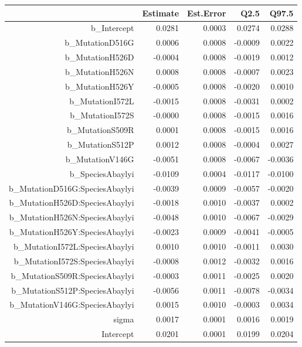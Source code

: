 \begin{table}[ht]
\centering
\begin{tabular}{rrrrr}
  \hline
 & Estimate & Est.Error & Q2.5 & Q97.5 \\ 
  \hline
b\_Intercept & 0.0281 & 0.0003 & 0.0274 & 0.0288 \\ 
  b\_MutationD516G & 0.0006 & 0.0008 & -0.0009 & 0.0022 \\ 
  b\_MutationH526D & -0.0004 & 0.0008 & -0.0019 & 0.0012 \\ 
  b\_MutationH526N & 0.0008 & 0.0008 & -0.0007 & 0.0023 \\ 
  b\_MutationH526Y & -0.0005 & 0.0008 & -0.0020 & 0.0010 \\ 
  b\_MutationI572L & -0.0015 & 0.0008 & -0.0031 & 0.0002 \\ 
  b\_MutationI572S & -0.0000 & 0.0008 & -0.0015 & 0.0016 \\ 
  b\_MutationS509R & 0.0001 & 0.0008 & -0.0015 & 0.0016 \\ 
  b\_MutationS512P & 0.0012 & 0.0008 & -0.0004 & 0.0027 \\ 
  b\_MutationV146G & -0.0051 & 0.0008 & -0.0067 & -0.0036 \\ 
  b\_SpeciesAbaylyi & -0.0109 & 0.0004 & -0.0117 & -0.0100 \\ 
  b\_MutationD516G:SpeciesAbaylyi & -0.0039 & 0.0009 & -0.0057 & -0.0020 \\ 
  b\_MutationH526D:SpeciesAbaylyi & -0.0018 & 0.0010 & -0.0037 & 0.0002 \\ 
  b\_MutationH526N:SpeciesAbaylyi & -0.0048 & 0.0010 & -0.0067 & -0.0029 \\ 
  b\_MutationH526Y:SpeciesAbaylyi & -0.0023 & 0.0009 & -0.0041 & -0.0005 \\ 
  b\_MutationI572L:SpeciesAbaylyi & 0.0010 & 0.0010 & -0.0011 & 0.0030 \\ 
  b\_MutationI572S:SpeciesAbaylyi & -0.0008 & 0.0012 & -0.0032 & 0.0016 \\ 
  b\_MutationS509R:SpeciesAbaylyi & -0.0003 & 0.0011 & -0.0025 & 0.0020 \\ 
  b\_MutationS512P:SpeciesAbaylyi & -0.0056 & 0.0011 & -0.0078 & -0.0034 \\ 
  b\_MutationV146G:SpeciesAbaylyi & 0.0015 & 0.0010 & -0.0003 & 0.0034 \\ 
  sigma & 0.0017 & 0.0001 & 0.0016 & 0.0019 \\ 
  Intercept & 0.0201 & 0.0001 & 0.0199 & 0.0204 \\ 

\end{tabular}
\end{table}
